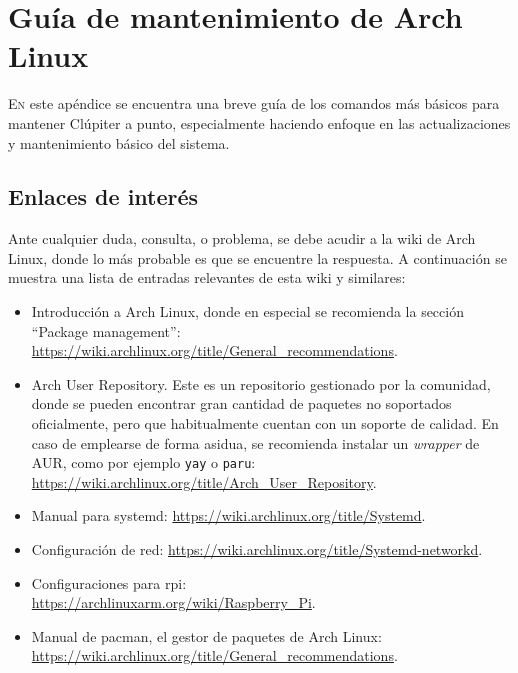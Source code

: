 \chapter{Guía de mantenimiento de Arch Linux}
\label{chap:archlinux_maintenance_guide}

\lettrine{E}{n} este apéndice se encuentra una breve guía de los comandos más básicos para mantener Clúpiter a punto, especialmente haciendo enfoque en las actualizaciones y mantenimiento básico del sistema.

\section{Enlaces de interés}
Ante cualquier duda, consulta, o problema, se debe acudir a la wiki de Arch Linux, donde lo más probable es que se encuentre la respuesta. A continuación se muestra una lista de entradas relevantes de esta wiki y similares:

\begin{itemize}
    \item Introducción a Arch Linux, donde en especial se recomienda la sección ``Package management'':
    \url{https://wiki.archlinux.org/title/General_recommendations}.

    \item Arch User Repository. Este es un repositorio gestionado por la comunidad, donde se pueden encontrar gran cantidad de paquetes no soportados oficialmente, pero que habitualmente cuentan con un soporte de calidad. En caso de emplearse de forma asidua, se recomienda instalar un \textit{wrapper} de AUR, como por ejemplo \texttt{yay} o \texttt{paru}:\\
    \url{https://wiki.archlinux.org/title/Arch_User_Repository}.

    \item Manual para systemd: \url{https://wiki.archlinux.org/title/Systemd}.
    \item Configuración de red: \url{https://wiki.archlinux.org/title/Systemd-networkd}.
    \item Configuraciones para \acrlong{rpi}: \\\url{https://archlinuxarm.org/wiki/Raspberry_Pi}.

    \item Manual de pacman, el gestor de paquetes de Arch Linux: \\\url{https://wiki.archlinux.org/title/General_recommendations}.
\end{itemize}

